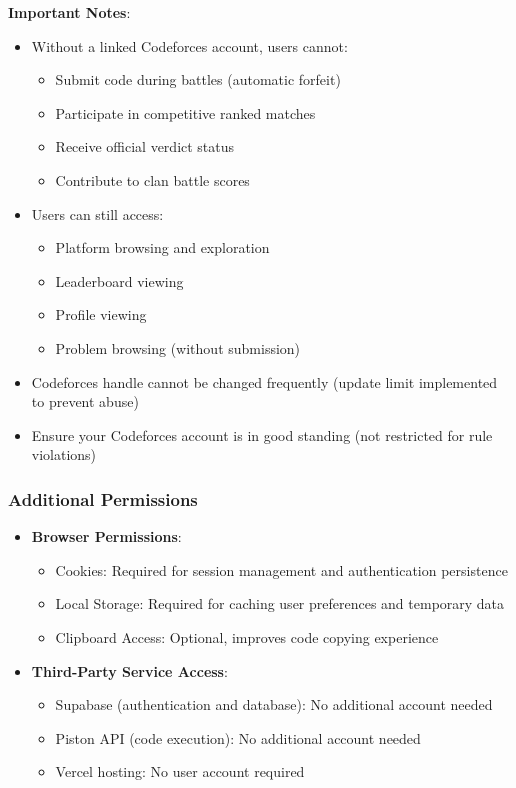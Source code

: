 \documentclass[12pt]{article}
\begin{document}
\textbf{Important Notes}:
\begin{itemize}
\item Without a linked Codeforces account, users cannot:
  \begin{itemize}
    \item Submit code during battles (automatic forfeit)
    \item Participate in competitive ranked matches
    \item Receive official verdict status
    \item Contribute to clan battle scores
  \end{itemize}
\item Users can still access:
  \begin{itemize}
    \item Platform browsing and exploration
    \item Leaderboard viewing
    \item Profile viewing
    \item Problem browsing (without submission)
  \end{itemize}
\item Codeforces handle cannot be changed frequently (update limit implemented to prevent abuse)
\item Ensure your Codeforces account is in good standing (not restricted for rule violations)
\end{itemize}


\subsubsection{Additional Permissions}

\begin{itemize}
\item \textbf{Browser Permissions}:
  \begin{itemize}
    \item Cookies: Required for session management and authentication persistence
    \item Local Storage: Required for caching user preferences and temporary data
    \item Clipboard Access: Optional, improves code copying experience
  \end{itemize}
\item \textbf{Third-Party Service Access}:
  \begin{itemize}
    \item Supabase (authentication and database): No additional account needed
    \item Piston API (code execution): No additional account needed
    \item Vercel hosting: No user account required
  \end{itemize}
\end{itemize}
\end{document}
